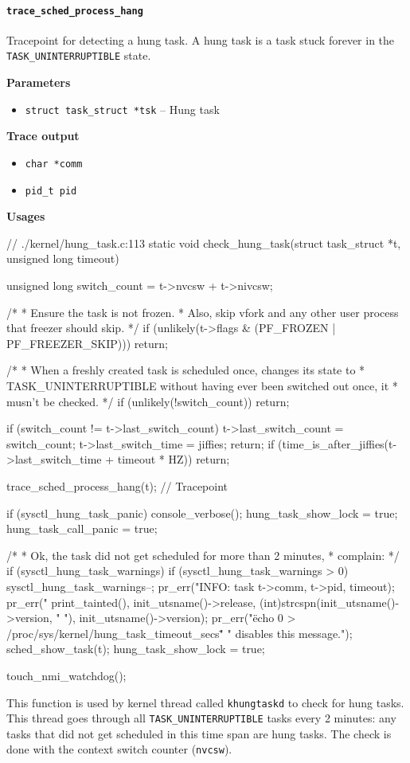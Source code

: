 \paragraph{\texttt{trace\_sched\_process\_hang}}
Tracepoint for detecting a hung task. A hung task is a task stuck forever in the \verb|TASK_UNINTERRUPTIBLE| state.

\textbf{Parameters}
\begin{itemize}
    \item \verb|struct task_struct *tsk| -- Hung task
\end{itemize}

\textbf{Trace output}
\begin{itemize}
    \item \verb|char *comm|
    \item \verb|pid_t pid|
\end{itemize}

\textbf{Usages}
\begin{code}
// ./kernel/hung_task.c:113
static void check_hung_task(struct task_struct *t, unsigned long timeout){
	unsigned long switch_count = t->nvcsw + t->nivcsw;

	/*
	 * Ensure the task is not frozen.
	 * Also, skip vfork and any other user process that freezer should skip.
	 */
	if (unlikely(t->flags & (PF_FROZEN | PF_FREEZER_SKIP)))
	    return;

	/*
	 * When a freshly created task is scheduled once, changes its state to
	 * TASK_UNINTERRUPTIBLE without having ever been switched out once, it
	 * musn't be checked.
	 */
	if (unlikely(!switch_count))
		return;

	if (switch_count != t->last_switch_count) {
		t->last_switch_count = switch_count;
		t->last_switch_time = jiffies;
		return;
	}
	if (time_is_after_jiffies(t->last_switch_time + timeout * HZ))
		return;

	trace_sched_process_hang(t); // Tracepoint

	if (sysctl_hung_task_panic) {
		console_verbose();
		hung_task_show_lock = true;
		hung_task_call_panic = true;
	}

	/*
	 * Ok, the task did not get scheduled for more than 2 minutes,
	 * complain:
	 */
	if (sysctl_hung_task_warnings) {
		if (sysctl_hung_task_warnings > 0)
			sysctl_hung_task_warnings--;
		pr_err("INFO: task %
			t->comm, t->pid, timeout);
		pr_err("      %
			print_tainted(), init_utsname()->release,
			(int)strcspn(init_utsname()->version, " "),
			init_utsname()->version);
		pr_err("\"echo 0 > /proc/sys/kernel/hung_task_timeout_secs\""
			" disables this message.\n");
		sched_show_task(t);
		hung_task_show_lock = true;
	}

	touch_nmi_watchdog();
}
\end{code}
This function is used by kernel thread called \verb|khungtaskd| to check for hung tasks. This thread goes through all \verb|TASK_UNINTERRUPTIBLE| tasks every 2 minutes: any tasks that did not get scheduled in this time span are hung tasks. The check is done with the context switch counter (\verb|nvcsw|).
  
